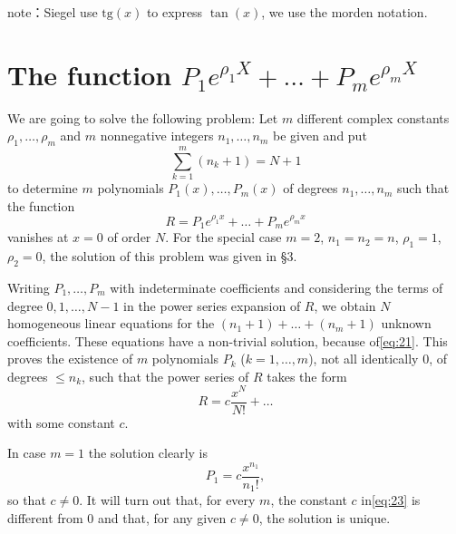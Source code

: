\begin{remark} note：Siegel use $\text{tg}(x)$ to express $\tan(x)$, we use the morden notation. \end{remark}

\section{The function $P_1 e^{\rho_1 X} + \dots + P_m e^{\rho_m X}$}

We are going to solve the following problem: Let $m$ different complex constants $\rho_1,\ldots,\rho_m$ and $m$ nonnegative integers $n_1,\ldots,n_m$ be given and put
\begin{equation} \sum_{k=1}^{m} (n_k + 1) = N + 1 \tag{21}\label{eq:21} \end{equation}
to determine $m$ polynomials $P_1(x),\ldots, P_m(x)$ of degrees $n_1,\ldots,n_m$ such that the function
\begin{equation} R = P_{1}e^{\rho_{1}x} + \dots + P_{m}e^{\rho_{m}x} \tag{22}\label{eq:22} \end{equation} 
vanishes at $x=0$ of order $N$. For the special case $m=2$, $n_1=n_2=n$, $\rho_1=1$, $\rho_2=0$, the solution of this problem was given in \S 3.

Writing $P_1, \dots, P_m$ with indeterminate coefficients and considering the terms of degree $0, 1, \dots, N-1$ in the power series expansion of $R$, we obtain $N$ homogeneous linear equations for the $(n_1+1) + \dots + (n_m+1)$ unknown coefficients. These equations have a non-trivial solution, because of\eqref{eq:21}. This proves the existence of $m$ polynomials $P_k$ ($k=1,\dots,m$), not all identically 0, of degrees $\leq n_k$, such that the power series of $R$ takes the form
\begin{equation} R = c \frac{x^{N}}{N!} + \dots \tag{23}\label{eq:23} \end{equation}
with some constant $c$.

In case $m=1$ the solution clearly is
\[ P_1 = c \frac{x^{n_1}}{n_1!} , \]
so that $c \neq 0$. It will turn out that, for every $m$, the constant $c$ in\eqref{eq:23} is different from 0 and that, for any given $c \neq 0$, the solution is unique.

